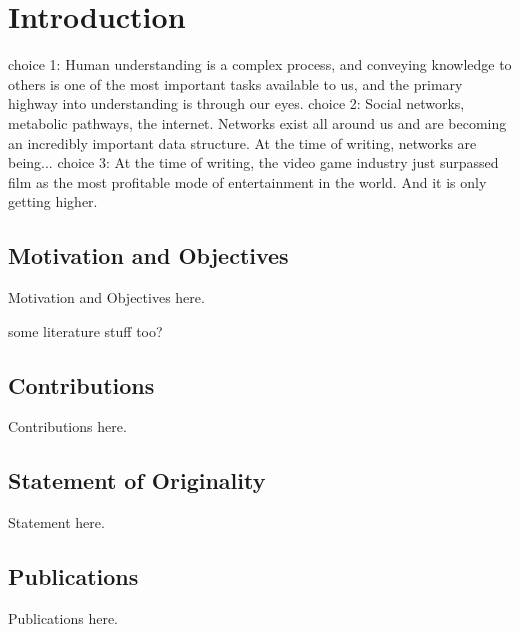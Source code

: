 \chapter{Introduction}
choice 1: Human understanding is a complex process, and conveying knowledge to others is one of the most important tasks available to us, and the primary highway into understanding is through our eyes.
choice 2: Social networks, metabolic pathways, the internet. Networks exist all around us and are becoming an incredibly important data structure. At the time of writing, networks are being...
choice 3: At the time of writing, the video game industry just surpassed film as the most profitable mode of entertainment in the world. And it is only getting higher.

\section{Motivation and Objectives}

Motivation and Objectives here.

some literature stuff too?

\section{Contributions}

Contributions here.


\section{Statement of Originality}

Statement here.


\section{Publications}

Publications here.